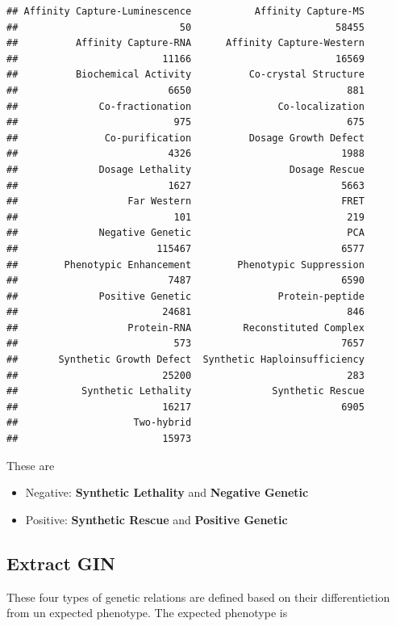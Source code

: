 \documentclass[12pt,]{article}
\providecommand{\tightlist}{%
  \setlength{\itemsep}{0pt}\setlength{\parskip}{0pt}}
\begin{document}
\begin{verbatim}
## Affinity Capture-Luminescence           Affinity Capture-MS 
##                            50                         58455 
##          Affinity Capture-RNA      Affinity Capture-Western 
##                         11166                         16569 
##          Biochemical Activity          Co-crystal Structure 
##                          6650                           881 
##              Co-fractionation               Co-localization 
##                           975                           675 
##               Co-purification          Dosage Growth Defect 
##                          4326                          1988 
##              Dosage Lethality                 Dosage Rescue 
##                          1627                          5663 
##                   Far Western                          FRET 
##                           101                           219 
##              Negative Genetic                           PCA 
##                        115467                          6577 
##        Phenotypic Enhancement        Phenotypic Suppression 
##                          7487                          6590 
##              Positive Genetic               Protein-peptide 
##                         24681                           846 
##                   Protein-RNA         Reconstituted Complex 
##                           573                          7657 
##       Synthetic Growth Defect  Synthetic Haploinsufficiency 
##                         25200                           283 
##           Synthetic Lethality              Synthetic Rescue 
##                         16217                          6905 
##                    Two-hybrid 
##                         15973
\end{verbatim}

These are

\begin{itemize}
\tightlist
\item
  Negative: \textbf{Synthetic Lethality} and \textbf{Negative Genetic}
\item
  Positive: \textbf{Synthetic Rescue} and \textbf{Positive Genetic}
\end{itemize}

\subsection{Extract GIN}\label{extract-gin}

These four types of genetic relations are defined based on their
differentietion from un expected phenotype. The expected phenotype is
\end{document}
